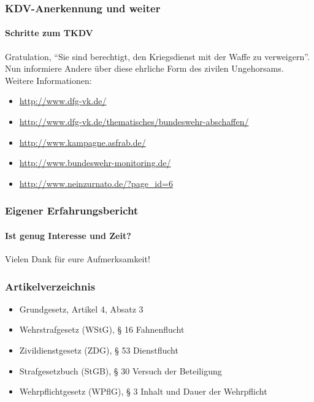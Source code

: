 \documentclass{beamer}
\begin{document}
	\begin{frame}
		\frametitle{KDV-Anerkennung und weiter}
		\framesubtitle{Schritte zum TKDV}
		Gratulation, \enquote{Sie sind berechtigt, den Kriegsdienst mit der Waffe zu verweigern}.\\
		Nun informiere Andere über diese ehrliche Form des zivilen Ungehorsams. \\
		Weitere Informationen:
		\begin{itemize}
			\item \href{http://www.dfg-vk.de/}{http://www.dfg-vk.de/}
			\item \href{http://www.dfg-vk.de/thematisches/bundeswehr-abschaffen/}{http://www.dfg-vk.de/thematisches/bundeswehr-abschaffen/}
			\item \href{http://www.kampagne.asfrab.de/}{http://www.kampagne.asfrab.de/}
			\item \href{http://www.bundeswehr-monitoring.de/}{http://www.bundeswehr-monitoring.de/}
			\item \href{http://www.neinzurnato.de/?page_id=6}{http://www.neinzurnato.de/?page\_id=6}
		\end{itemize} 	
	\end{frame}

	\begin{frame}
		\frametitle{Eigener Erfahrungsbericht}
		\framesubtitle{Ist genug Interesse und Zeit?}
		Vielen Dank für eure Aufmerksamkeit!
	\end{frame}
	
	\begin{frame}
		\frametitle{Artikelverzeichnis}
		\begin{itemize}
			\item Grundgesetz, Artikel 4, Absatz 3
			\item Wehrstrafgesetz (WStG), § 16 Fahnenflucht
			\item Zivildienstgesetz (ZDG), § 53 Dienstflucht
			\item Strafgesetzbuch (StGB), § 30 Versuch der Beteiligung
			\item Wehrpflichtgesetz (WPflG), § 3 Inhalt und Dauer der Wehrpflicht
		\end{itemize}
	\end{frame}
	
\end{document}
